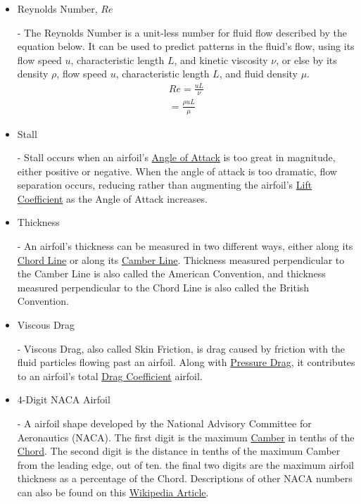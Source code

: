 \documentclass{article}
\begin{document}
\begin{itemize}
	\item \hypertarget{Re}{Reynolds Number, $Re$} - The Reynolds Number is a unit-less number for fluid flow described by the equation below. It can be used to predict patterns in the fluid's flow, using its flow speed $u$, characteristic length $L$, and kinetic viscosity $\nu$, or else by its density $\rho$, flow speed $u$, characteristic length $L$, and fluid density $\mu$.
		\begin{equation} \label{eq:17}
		\begin{aligned}
        			Re = \frac{uL}{\nu} \\
			= \frac{\rho uL}{\mu} 
	    	\end{aligned}
		\end{equation}
	
	\item \hypertarget{ST}{Stall} - Stall occurs when an airfoil's \hyperlink{alpha}{Angle of Attack} is too great in magnitude, either positive or negative. When the angle of attack is too dramatic, flow separation occurs, reducing rather than augmenting the airfoil's \hyperlink{CL}{Lift Coefficient} as the Angle of Attack increases.
	
	\item \hypertarget{Th}{Thickness} - An airfoil's thickness can be measured in two different ways, either along its \hyperlink{c}{Chord Line} or along its \hyperlink{Camber}{Camber Line}. Thickness measured perpendicular to the Camber Line is also called the American Convention, and thickness measured perpendicular to the Chord Line is also called the British Convention.
	
	\item \hypertarget{VD}{Viscous Drag} - Viscous Drag, also called Skin Friction, is drag caused by friction with the fluid particles flowing past an airfoil. Along with \hyperlink{PD}{Pressure Drag}, it contributes to an airfoil's total \hyperlink{CD}{Drag Coefficient} airfoil.
		
	\item \hypertarget{NACA}{4-Digit NACA Airfoil} - A airfoil shape developed by the National Advisory Committee for Aeronautics (NACA). The first digit is the maximum \hyperlink{Camber}{Camber} in tenths of the \hyperlink{c}{Chord}. The second digit is the distance in tenths of the maximum Camber from the leading edge, out of ten. the final two digits are the maximum airfoil thickness as a percentage of the Chord. Descriptions of other NACA numbers can also be found on this \href{https://en.wikipedia.org/wiki/NACA_airfoil}{Wikipedia Article}. 
	
\end{itemize}
\end{document}
